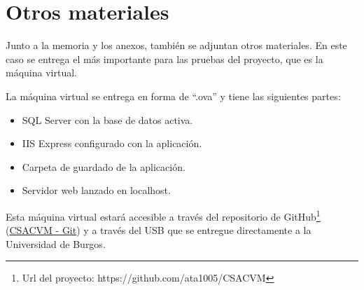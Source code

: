 \section{Otros materiales}
Junto a la memoria y los anexos, también se adjuntan otros materiales. En este caso 
se entrega el más importante para las pruebas del proyecto, que es la máquina virtual.

La máquina virtual se entrega en forma de ``.ova'' y tiene las siguientes partes:

\begin{itemize}
\item
	SQL Server con la base de datos activa.
\item
	IIS Express configurado con la aplicación.
\item	
	Carpeta de guardado de la aplicación.
\item	
	Servidor web lanzado en localhost.
\end{itemize}

Esta máquina virtual estará accesible a través del repositorio de GitHub\footnote{Url del proyecto: https://github.com/ata1005/CSACVM} (\href{https://github.com/ata1005/CSACVM}{CSACVM - Git}) y a través del USB que se entregue directamente a la Universidad de Burgos. 
